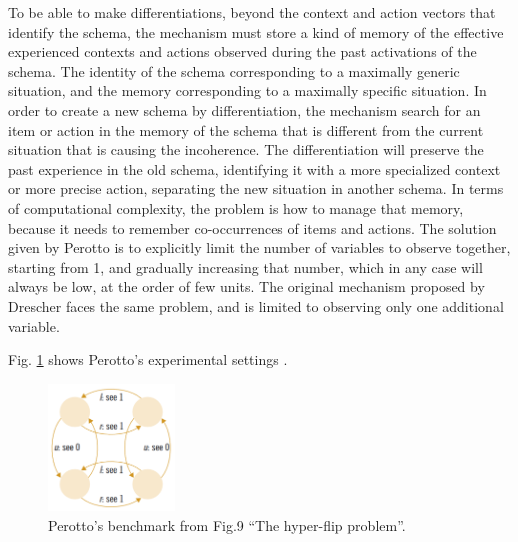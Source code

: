 \documentclass[runningheads]{llncs}
\begin{document}
To be able to make differentiations, beyond the context and action vectors that identify the schema, the mechanism must store a kind of memory of the effective experienced contexts and actions observed during the past activations of the schema.
The identity of the schema corresponding to a maximally generic situation, and the memory corresponding to a maximally specific situation.
In order to create a new schema by differentiation, the mechanism search for an item or action in the memory of the schema that is different from the current situation that is causing the incoherence. 
The differentiation will preserve the past experience in the old schema, identifying it with a more specialized context or more precise action, separating the new situation in another schema.
In terms of computational complexity, the problem is how to manage that memory, because it needs to remember co-occurrences of items and actions.
The solution given by Perotto is to explicitly limit the number of variables to observe together, starting from 1, and gradually increasing that number, which in any case will always be low, at the order of few units.
The original mechanism proposed by Drescher faces the same problem, and is limited to observing only one additional variable.

%
Fig. \ref{fig:perotto_ben} shows Perotto's experimental settings \cite{Perotto:2013:CF}.

\begin{figure}
	\centering
	\includegraphics[width=0.3\textwidth]{Figure_perotto_benchmark.png}
	\caption{Perotto's benchmark from \cite{Perotto:2013:CF} Fig.9 ``The hyper-flip problem''.} 
	\label{fig:perotto_ben}
\end{figure}

\end{document}

